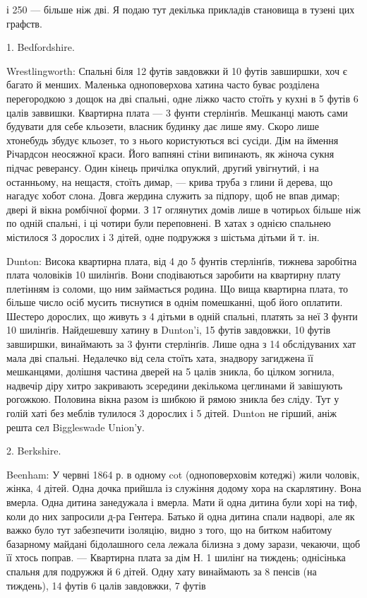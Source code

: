 \parcont{}  %
і 250 — більше ніж дві. Я подаю тут декілька прикладів становища
в тузені цих графств.

1. Bedfordshire.

Wrestlingworth: Спальні біля 12 футів завдовжки й 10 футів
завширшки, хоч є багато й менших. Маленька одноповерхова
хатина часто буває розділена перегородкою з дощок на дві
спальні, одне ліжко часто стоїть у кухні в 5 футів 6 цалів заввишки.
Квартирна плата — 3 фунти стерлінґів. Мешканці мають
сами будувати для себе кльозети, власник будинку дає лише
яму. Скоро лише хтонебудь збудує кльозет, то з нього користуються
всі сусіди. Дім на ймення Річардсон неосяжної краси.
Його вапняні стіни випинають, як жіноча сукня підчас реверансу.
Один кінець причілка опуклий, другий увігнутий, і на
останньому, на нещастя, стоїть димар, — крива труба з глини
й дерева, що нагадує хобот слона. Довга жердина служить за
підпору, щоб не впав димар; двері й вікна ромбічної форми.
З 17 оглянутих домів лише в чотирьох більше ніж по одній
спальні, і ці чотири були переповнені. В хатах з однією спальнею
містилося 3 дорослих і 3 дітей, одне подружжя з шістьма
дітьми й т. ін.

Dunton: Висока квартирна плата, від 4 до 5 фунтів стерлінґів,
тижнева заробітна плата чоловіків 10 шилінґів. Вони сподіваються
заробити на квартирну плату плетінням із соломи, що ним займається
родина. Що вища квартирна плата, то більше число осіб
мусить тиснутися в однім помешканні, щоб його оплатити. Шестеро
дорослих, що живуть з 4 дітьми в одній спальні, платять за неї
З фунти 10 шилінґів. Найдешевшу хатину в Dunton’i, 15 футів
завдовжки, 10 футів завширшки, винаймають за 3 фунти стерлінґів.
Лише одна з 14 обслідуваних хат мала дві спальні. Недалечко
від села стоїть хата, знадвору загиджена її мешканцями, долішня
частина дверей на 5 цалів зникла, бо цілком зогнила, надвечір
діру хитро закривають зсередини декількома цеглинами й завішують
рогожкою. Половина вікна разом із шибкою й рямою
зникла без сліду. Тут у голій хаті без меблів тулилося 3 дорослих
і 5 дітей. Dunton не гірший, аніж решта сел Biggleswade Union’у.

2. Berkshire.

Beenham: У червні 1864 р. в одному cot (одноповерховім
котеджі) жили чоловік, жінка, 4 дітей. Одна дочка прийшла із
служіння додому хора на скарлятину. Вона вмерла. Одна дитина
занедужала і вмерла. Мати й одна дитина були хорі на тиф, коли
до них запросили д-ра Гентера. Батько й одна дитина спали
надворі, але як важко було тут забезпечити ізоляцію, видно з
того, що на битком набитому базарному майдані бідолашного
села лежала білизна з дому зарази, чекаючи, щоб її хтось поправ.
— Квартирна плата за дім Н. 1 шилінґ на тиждень; однісінька
спальня для подружжя й 6 дітей. Одну хату винаймають
за 8 пенсів (на тиждень), 14 футів 6 цалів завдовжки, 7 футів
\parbreak{}  %
